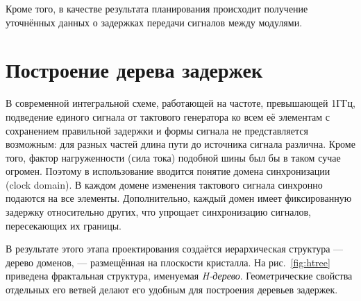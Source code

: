 Кроме того, в качестве результата планирования происходит получение уточнённых данных о задержках передачи сигналов между модулями. 



% 

\section{Построение дерева задержек}

В современной интегральной схеме, работающей на частоте, превышающей 1ГГц, подведение единого сигнала от тактового генератора ко всем её элементам с сохранением правильной задержки и формы сигнала не представляется возможным: для разных частей длина пути до источника сигнала различна. Кроме того, фактор нагруженности (сила тока) подобной шины был бы в таком сучае огромен. Поэтому в использование вводится понятие домена синхронизации (\abbr clock domain). В каждом домене изменения тактового сигнала синхронно подаются на все элементы. Дополнительно, каждый домен имеет фиксированную задержку относительно других, что упрощает синхронизацию сигналов, пересекающих их границы.

В результате этого этапа проектирования создаётся иерархическая структура — дерево доменов, — размещённая на плоскости кристалла. На рис.~\ref{fig:htree} приведена фрактальная структура, именуемая \textit{H-дерево}. Геометрические свойства отдельных его ветвей делают его удобным для построения деревьев задержек.

